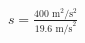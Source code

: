 \documentclass[preview]{standalone}
\begin{document}
\begin{align*}
s = \frac{400 \text{ m}^2/\text{s}^2}{19.6 \text{ m/s}^2}
\end{align*}
\end{document}
